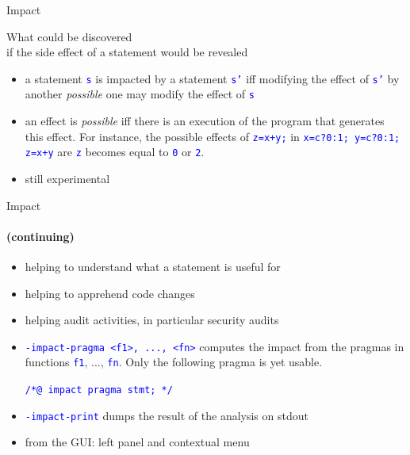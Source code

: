\documentclass{beamer}
\newcommand{\orange}[1]{{\textcolor{frama-c-1}{#1}}}
\newcommand{\vvert}[1]{{\textcolor{vert}{#1}}}
\newcommand{\bleu}[1]{{\textcolor{blue}{#1}}}
\newcommand{\goup}{\vspace{-5pt}}
\newcommand{\code}[1]{\bleu{\texttt{#1}}}
\newcommand{\continuing}{\framesubtitle{(continuing)}}
\newcommand{\intro}[1]{\begin{center}\vvert{#1}\end{center}}
\newenvironment{sect}[1]{\orange{#1}\begin{itemize}}{\end{itemize}}
\newenvironment{whatitisgoodfor}{\begin{sect}{What is it good for}}{\end{sect}}
\newenvironment{howtouse}{\begin{sect}{How to use}}{\end{sect}}
\newenvironment{precise}{\begin{sect}{More precisely}}{\end{sect}}
\begin{document}

\begin{frame}{Impact}

\goup
\intro{What could be discovered \\
if the side effect of a statement would be revealed}
\goup

\begin{precise}
\item a statement \code{s} is impacted by a statement \code{s'} iff modifying
  the effect of \code{s'} by another \emph{possible} one may modify the effect
  of \code{s}
\item an effect is \emph{possible} iff there is an execution of the program
  that generates this effect. For instance, the possible effects of
  \code{z=x+y;} in \code{x=c?0:1; y=c?0:1; z=x+y} are \code{z} becomes equal to
  \code{0} or \code{2}.
\end{precise}\smallskip

\begin{sect}{Warning}
\item still experimental
\end{sect}

\end{frame}


\begin{frame}{Impact}
\continuing

\begin{whatitisgoodfor}
\item helping to understand what a statement is useful for
\item helping to apprehend code changes
\item helping audit activities, in particular security audits
\end{whatitisgoodfor}\medskip

\begin{howtouse}
\item \code{-impact-pragma <f1>, ..., <fn>} computes the impact from the pragmas
  in functions \code{f1}, ..., \code{fn}. Only the following pragma is yet
  usable.
  
  \code{/*@ impact pragma stmt; */}
\item \code{-impact-print} dumps the result of the analysis on stdout
\item from the GUI: left panel and contextual menu
\end{howtouse}

\end{frame}
\end{document}
